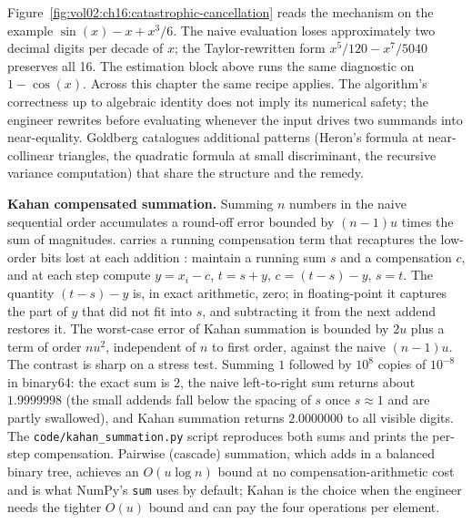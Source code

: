 Figure~\ref{fig:vol02:ch16:catastrophic-cancellation} reads the
mechanism on the example $\sin(x) - x + x^{3}/6$. The naive
evaluation loses approximately two decimal digits per decade of
$x$; the Taylor-rewritten form $x^{5}/120 - x^{7}/5040$ preserves
all 16. The estimation block above runs the same diagnostic on
$1 - \cos(x)$. Across this chapter the same recipe applies. The
algorithm's correctness up to algebraic identity does not imply
its numerical safety; the engineer rewrites before evaluating
whenever the input drives two summands into near-equality. Goldberg
\cite{text:goldberg1991-floating-point} catalogues additional
patterns (Heron's formula at near-collinear triangles, the
quadratic formula at small discriminant, the recursive variance
computation) that share the structure and the remedy.

\begin{example}
\textbf{Kahan compensated summation.} Summing $n$ numbers in the
naive sequential order accumulates a round-off error bounded by
$(n - 1) u$ times the sum of magnitudes. 
carries a running compensation term that recaptures the low-order
bits lost at each addition \cite{text:v2ch16-kahan-1965}: maintain a
running sum $s$ and a compensation $c$, and at each step compute
$y = x_{i} - c$, $t = s + y$, $c = (t - s) - y$, $s = t$. The
quantity $(t - s) - y$ is, in exact arithmetic, zero; in
floating-point it captures the part of $y$ that did not fit into
$s$, and subtracting it from the next addend restores it. The
worst-case error of Kahan summation is bounded by $2u$ plus a term
of order $n u^{2}$, independent of $n$ to first order, against the
naive $(n - 1) u$. The contrast is sharp on a stress test. Summing
$1$ followed by $10^{8}$ copies of $10^{-8}$ in binary64: the exact
sum is $2$, the naive left-to-right sum returns about $1.9999998$
(the small addends fall below the spacing of $s$ once $s \approx 1$
and are partly swallowed), and Kahan summation returns $2.0000000$
to all visible digits. The
\texttt{code/kahan\_summation.py} script reproduces both sums and
prints the per-step compensation. Pairwise (cascade) summation,
which adds in a balanced binary tree, achieves an $O(u \log n)$
bound at no compensation-arithmetic cost and is what NumPy's
\texttt{sum} uses by default; Kahan is the choice when the engineer
needs the tighter $O(u)$ bound and can pay the four operations per
element.
\end{example}

